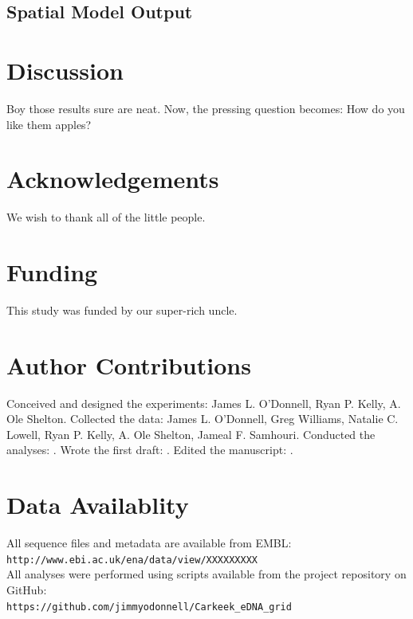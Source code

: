 \documentclass[11pt,letterpaper]{article} %
\begin{document}
\subsection*{Spatial Model Output}


\section*{Discussion}
Boy those results sure are neat. Now, the pressing question becomes: How do you like them apples?

\section*{Acknowledgements}
We wish to thank all of the little people.

\section*{Funding}
This study was funded by our super-rich uncle.

\section*{Author Contributions}
Conceived and designed the experiments: James L. O'Donnell, Ryan P. Kelly, A. Ole Shelton.
Collected the data: James L. O'Donnell, Greg Williams, Natalie C. Lowell, Ryan P. Kelly, A. Ole Shelton, Jameal F. Samhouri.
Conducted the analyses: .
Wrote the first draft: .
Edited the manuscript: .


\section*{Data Availablity}
All sequence files and metadata are available from EMBL:\\ \verb!http://www.ebi.ac.uk/ena/data/view/XXXXXXXXX! \\
All analyses were performed using scripts available from the project repository on GitHub:\\  \verb!https://github.com/jimmyodonnell/Carkeek_eDNA_grid!\\
\end{document}
